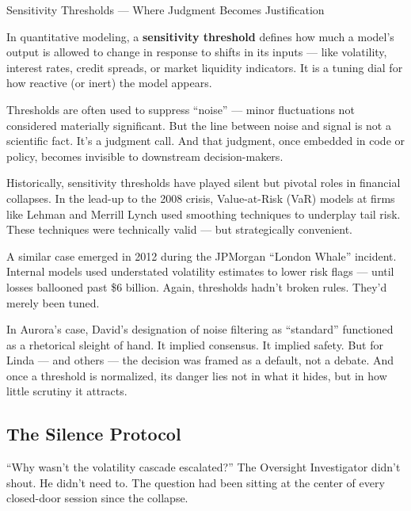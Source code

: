 \medskip

\begin{TechnicalSidebar}{Sensitivity Thresholds — Where Judgment Becomes Justification}

  In quantitative modeling, a \textbf{sensitivity threshold} defines how much a model’s output is allowed 
  to change in response to shifts in its inputs — like volatility, interest rates, credit spreads, or market 
  liquidity indicators. It is a tuning dial for how reactive (or inert) the model appears.

  \medskip
  
  Thresholds are often used to suppress ``noise'' — minor fluctuations not considered materially significant. 
  But the line between noise and signal is not a scientific fact. It’s a judgment call. And that judgment, 
  once embedded in code or policy, becomes invisible to downstream decision-makers.

  \medskip
  
  Historically, sensitivity thresholds have played silent but pivotal roles in financial collapses. In the 
  lead-up to the 2008 crisis, Value-at-Risk (VaR) models at firms like Lehman and Merrill Lynch used smoothing 
  techniques to underplay tail risk. These techniques were technically valid — but strategically convenient.

  \medskip
  
  A similar case emerged in 2012 during the JPMorgan ``London Whale'' incident. Internal models used 
  understated volatility estimates to lower risk flags — until losses ballooned past \$6 billion. Again, 
  thresholds hadn’t broken rules. They’d merely been tuned.

  \medskip
  
  In Aurora’s case, David’s designation of noise filtering as ``standard'' functioned as a rhetorical sleight 
  of hand. It implied consensus. It implied safety. But for Linda — and others — the decision was framed as a 
  default, not a debate. And once a threshold is normalized, its danger lies not in what it hides, but in 
  how little scrutiny it attracts.
  
\end{TechnicalSidebar}
  
\subsection{The Silence Protocol}

“Why wasn’t the volatility cascade escalated?”
The Oversight Investigator didn’t shout. He didn’t need to. The question had been sitting at the center of every 
closed-door session since the collapse.

